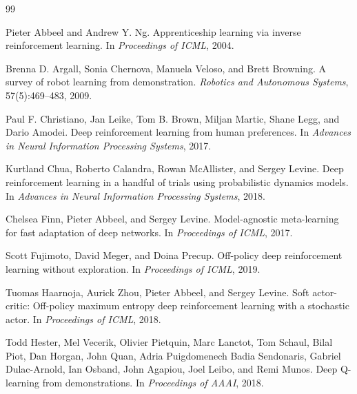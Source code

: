 \documentclass{article}
\begin{document}
\begin{thebibliography}{99}

Pieter Abbeel and Andrew Y. Ng.
\newblock Apprenticeship learning via inverse reinforcement learning.
\newblock In \emph{Proceedings of ICML}, 2004.

Brenna D. Argall, Sonia Chernova, Manuela Veloso, and Brett Browning.
\newblock A survey of robot learning from demonstration.
\newblock \emph{Robotics and Autonomous Systems}, 57(5):469--483, 2009.

Paul F. Christiano, Jan Leike, Tom B. Brown, Miljan Martic, Shane Legg, and Dario Amodei.
\newblock Deep reinforcement learning from human preferences.
\newblock In \emph{Advances in Neural Information Processing Systems}, 2017.

Kurtland Chua, Roberto Calandra, Rowan McAllister, and Sergey Levine.
\newblock Deep reinforcement learning in a handful of trials using probabilistic dynamics models.
\newblock In \emph{Advances in Neural Information Processing Systems}, 2018.

Chelsea Finn, Pieter Abbeel, and Sergey Levine.
\newblock Model-agnostic meta-learning for fast adaptation of deep networks.
\newblock In \emph{Proceedings of ICML}, 2017.

Scott Fujimoto, David Meger, and Doina Precup.
\newblock Off-policy deep reinforcement learning without exploration.
\newblock In \emph{Proceedings of ICML}, 2019.

Tuomas Haarnoja, Aurick Zhou, Pieter Abbeel, and Sergey Levine.
\newblock Soft actor-critic: Off-policy maximum entropy deep reinforcement learning with a stochastic actor.
\newblock In \emph{Proceedings of ICML}, 2018.

Todd Hester, Mel Vecerik, Olivier Pietquin, Marc Lanctot, Tom Schaul, Bilal Piot, Dan Horgan, John Quan, Adria Puigdomenech Badia Sendonaris, Gabriel Dulac-Arnold, Ian Osband, John Agapiou, Joel Leibo, and Remi Munos.
\newblock Deep Q-learning from demonstrations.
\newblock In \emph{Proceedings of AAAI}, 2018.


\end{thebibliography}
\end{document}

